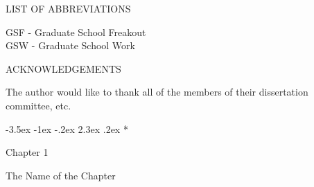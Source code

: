 \documentclass[12pt]{article}
\makeatletter
\renewcommand\section{\@startsection {section}{1}{\z@}%
                                   {-3.5ex \@plus -1ex \@minus -.2ex}%
                                   {2.3ex \@plus.2ex}%
                                   {\normalfont\scshape\bfseries\LARGE}}
\makeatother
\begin{document}
\listoffigures





\newpage
\thispagestyle{plain}

\listoftables

\newpage
\thispagestyle{plain}

\begin{center}
LIST OF ABBREVIATIONS\\
\end{center}

\singlespacing
\noindent
GSF - Graduate School Freakout\\
GSW - Graduate School Work

\newpage
\thispagestyle{plain}

\begin{center}
ACKNOWLEDGEMENTS\\
\end{center}

\noindent
The author would like to thank all of the members of their dissertation committee, etc.
\lipsum[3-4]



\newpage
\section*{Chapter 1 \\
\begin{flushright}
 The Name of the Chapter
 \end{flushright}}
\renewcommand{\thepage}{\arabic{page}}
\setcounter{page}{1}
\vspace{4cm}
\end{document}
